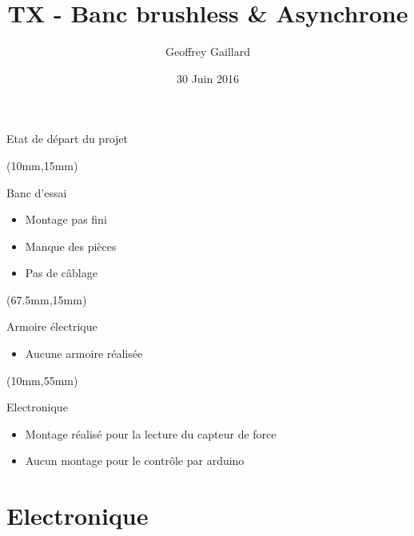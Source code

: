 \documentclass[10pt]{beamer}
\title{TX - Banc brushless \& Asynchrone}
\date{30 Juin 2016}
\author{Geoffrey Gaillard}
\institute{Université de Technologie de Troyes}
\begin{document}
	\maketitle

	\begin{frame}{Etat de départ du projet}

		\begin{textblock*}{80mm}(10mm,15mm)
			\begin{block}{Banc d'essai} 
				\begin{itemize}
					\item Montage pas fini
					\item Manque des pièces
					\item Pas de câblage
				\end{itemize}
			\end{block}
		\end{textblock*}
		
		\begin{textblock*}{60mm}(67.5mm,15mm)
			\begin{block}{Armoire électrique}
				\begin{itemize}
					\item Aucune armoire réalisée
				\end{itemize}
			\end{block}
		\end{textblock*}

		\begin{textblock*}{90mm}(10mm,55mm)
			\begin{block}{Electronique}
				\begin{itemize}
					\item Montage réalisé pour la lecture du capteur de force
					\item Aucun montage pour le contrôle par arduino
				\end{itemize}
			\end{block}
		\end{textblock*}

	\end{frame}
	
	\section{Electronique}
\end{document}
